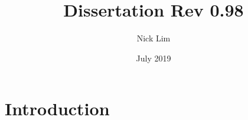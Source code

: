 \documentclass{article}
\title{Dissertation Rev 0.98}
\author{Nick Lim}
\date{July 2019}
\begin{document}
\maketitle

\section{Introduction}
\end{document}
